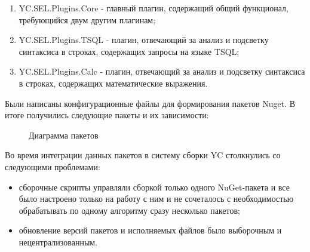\documentclass{matmex-diploma-custom}
\begin{document}
\begin{enumerate}
\item
YC.SEL.Plugins.Core - главный плагин, содержащий общий функционал, требующийся двум другим плагинам;
\item
YC.SEL.Plugins.TSQL - плагин, отвечающий за анализ и подсветку синтаксиса в строках, содержащих запросы на языке TSQL;
\item
YC.SEL.Plugins.Calc - плагин, отвечающий за анализ и подсветку синтаксиса в строках, содержащих математические выражения.
\end{enumerate}

Были написаны конфигурационные файлы для формирования пакетов Nuget. В итоге получились следующие пакеты и их зависимости:


\begin{figure}[h!]
	\caption{Диаграмма пакетов}
\end{figure}

Во время интеграции данных пакетов в систему сборки YC столкнулись со следующими проблемами:

\begin{itemize}
\item
сборочные скрипты управляли сборкой только одного NuGet-пакета и все было настроено только на работу с ним и не сочеталось с необходимостью обрабатывать по одному алгоритму сразу несколько пакетов;
\item
обновление версий пакетов и исполняемых файлов было выборочным и нецентрализованным.
\end{itemize}
\end{document}
